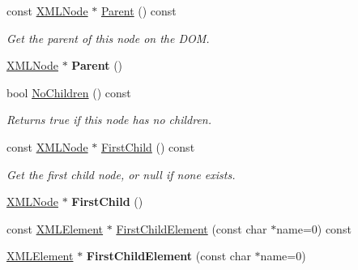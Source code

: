 \begin{DoxyCompactItemize}
const \hyperlink{classtinyxml2_1_1_x_m_l_node}{X\+M\+L\+Node} $\ast$ \hyperlink{classtinyxml2_1_1_x_m_l_node_ae0f62bc186c56c2e0483ebd52dbfbe34}{Parent} () const
\begin{DoxyCompactList}\small\item\em Get the parent of this node on the D\+OM. \end{DoxyCompactList}\item 
\mbox{\label{classtinyxml2_1_1_x_m_l_node_a76029693a5a54fbb721a41d7a0ca8a97}} 
\hyperlink{classtinyxml2_1_1_x_m_l_node}{X\+M\+L\+Node} $\ast$ {\bfseries Parent} ()
\item 
\mbox{\label{classtinyxml2_1_1_x_m_l_node_ac3ab489e6e202a3cd1762d3b332e89d4}} 
bool \hyperlink{classtinyxml2_1_1_x_m_l_node_ac3ab489e6e202a3cd1762d3b332e89d4}{No\+Children} () const
\begin{DoxyCompactList}\small\item\em Returns true if this node has no children. \end{DoxyCompactList}\item 
\mbox{\label{classtinyxml2_1_1_x_m_l_node_ae7dc225e1018cdd685f7563593a1fe08}} 
const \hyperlink{classtinyxml2_1_1_x_m_l_node}{X\+M\+L\+Node} $\ast$ \hyperlink{classtinyxml2_1_1_x_m_l_node_ae7dc225e1018cdd685f7563593a1fe08}{First\+Child} () const
\begin{DoxyCompactList}\small\item\em Get the first child node, or null if none exists. \end{DoxyCompactList}\item 
\mbox{\label{classtinyxml2_1_1_x_m_l_node_a2d6c70c475146b48bc93a7fafdeff5e0}} 
\hyperlink{classtinyxml2_1_1_x_m_l_node}{X\+M\+L\+Node} $\ast$ {\bfseries First\+Child} ()
\item 
const \hyperlink{classtinyxml2_1_1_x_m_l_element}{X\+M\+L\+Element} $\ast$ \hyperlink{classtinyxml2_1_1_x_m_l_node_a1bec132dcf085284e0a10755f2cf0d57}{First\+Child\+Element} (const char $\ast$name=0) const
\item 
\mbox{\label{classtinyxml2_1_1_x_m_l_node_af1e0e475cc27d5e7eeaf4d732691b741}} 
\hyperlink{classtinyxml2_1_1_x_m_l_element}{X\+M\+L\+Element} $\ast$ {\bfseries First\+Child\+Element} (const char $\ast$name=0)

\end{DoxyCompactItemize}
